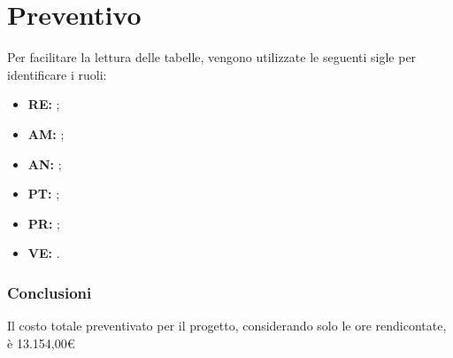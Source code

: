 \section{Preventivo}

Per facilitare la lettura delle tabelle, vengono utilizzate le seguenti sigle per identificare i ruoli:

\begin{itemize}
\item \textbf{RE:} \respProg;
\item \textbf{AM:} \ammProg;
\item \textbf{AN:} \analProg;
\item \textbf{PT:} \progetProg;
\item \textbf{PR:} \programProg;
\item \textbf{VE:} \verifProg.
\end{itemize}







\subsubsection{Conclusioni}

Il costo totale preventivato per il progetto, considerando solo le ore rendicontate, è 13.154,00\euro{}

